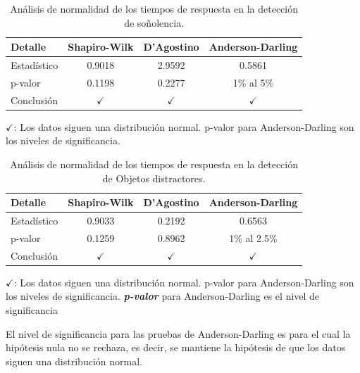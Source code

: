 \documentclass[a4paper,fleqn]{cas-sc}
\begin{document}
					\begin{table}[h]
						\centering
						\caption{Análisis de normalidad de los tiempos de respuesta en la detección de soñolencia.}
						\label{SleepingNormality}
						\begin{tabularx}{0.6\textwidth}{Xccc}
							\toprule
							\textbf{Detalle} & \textbf{Shapiro-Wilk} & \textbf{D'Agostino} & \textbf{Anderson-Darling}\\
							\midrule
							Estadístico & 0.9018 & 2.9592 &  0.5861 \\
							p-valor & 0.1198 & 0.2277 & 1\% al 5\% \\
							Conclusión & \(\checkmark\) & \(\checkmark\) & \(\checkmark\)\\
						\end{tabularx}
						\vspace{0.3em} %
						\parbox{0.75\textwidth}{\footnotesize
							\(\checkmark\): Los datos siguen una distribución normal. p-valor para Anderson-Darling son los niveles de significancia.
						}
					\end{table}
					
					\begin{table}[h]
						\centering
						\caption{Análisis de normalidad de los tiempos de respuesta en la detección de Objetos distractores.}
						\label{ObjectNormality}
						\begin{tabularx}{0.6\textwidth}{Xccc}
							\toprule
							\textbf{Detalle} & \textbf{Shapiro-Wilk} & \textbf{D'Agostino} & \textbf{Anderson-Darling}\\
							\midrule
							Estadístico & 0.9033 & 0.2192 & 0.6563 \\
							p-valor & 0.1259 & 0.8962 & 1\% al 2.5\% \\
							Conclusión & \(\checkmark\) & \(\checkmark\) & \(\checkmark\)\\
						\end{tabularx}
						\vspace{0.3em} %
						\parbox{0.75\textwidth}{\footnotesize
							\(\checkmark\): Los datos siguen una distribución normal. p-valor para Anderson-Darling son los niveles de significancia. \textbf{\textit{p-valor}} para Anderson-Darling es el nivel de significancia
						}
					\end{table}
					
					El nivel de significancia para las pruebas de Anderson-Darling es para el cual la hipótesis nula no se rechaza, es decir, se mantiene la hipótesis de que los datos siguen una distribución normal.
					
\end{document}
